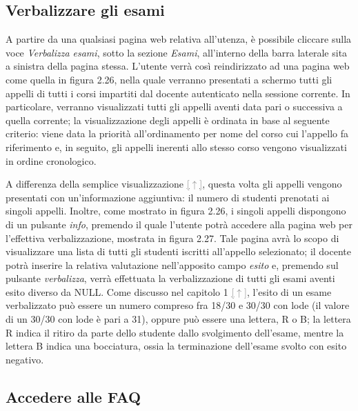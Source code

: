 \documentclass [a4paper,11pt]{book}
\begin{document}
\subsection{Verbalizzare gli esami}

A partire da una qualsiasi pagina web relativa all'utenza, è possibile cliccare sulla voce \emph{Verbalizza esami}, sotto la sezione \emph{Esami}, all'interno della barra laterale sita a sinistra della pagina stessa. L'utente verrà così reindirizzato ad una pagina web come quella in figura 2.26, nella quale verranno presentati a schermo tutti gli appelli di tutti i corsi impartiti dal docente autenticato nella sessione corrente. In particolare, verranno visualizzati tutti gli appelli aventi data pari o successiva a quella corrente; la visualizzazione degli appelli è ordinata in base al seguente criterio: viene data la priorità all'ordinamento per nome del corso cui l'appello fa riferimento e, in seguito, gli appelli inerenti allo stesso corso vengono visualizzati in ordine cronologico.


A differenza della semplice visualizzazione \hyperref[sec:visualizzaAppelli]{\textcolor{gray}{[$\uparrow$]}}, questa volta gli appelli vengono presentati con un'informazione aggiuntiva: il numero di studenti prenotati ai singoli appelli. Inoltre, come mostrato in figura 2.26, i singoli appelli dispongono di un pulsante \emph{info}, premendo il quale l'utente potrà accedere alla pagina web per l'effettiva verbalizzazione, mostrata in figura 2.27. Tale pagina avrà lo scopo di visualizzare una lista di tutti gli studenti iscritti all'appello selezionato; il docente potrà inserire la relativa valutazione nell'apposito campo \emph{esito} e, premendo sul pulsante \emph{verbalizza}, verrà effettuata la verbalizzazione di tutti gli esami aventi esito diverso da NULL. Come discusso nel capitolo 1 \hyperref[sec:specifiche]{\textcolor{gray}{[$\uparrow$]}}, l'esito di un esame verbalizzato può essere un numero compreso fra 18/30 e 30/30 con lode (il valore di un 30/30 con lode è pari a 31), oppure può essere una lettera, R o B; la lettera R indica il ritiro da parte dello studente dallo svolgimento dell'esame, mentre la lettera B indica una bocciatura, ossia la terminazione dell'esame svolto con esito negativo.


\medskip

\subsection{Accedere alle FAQ}
\end{document}
